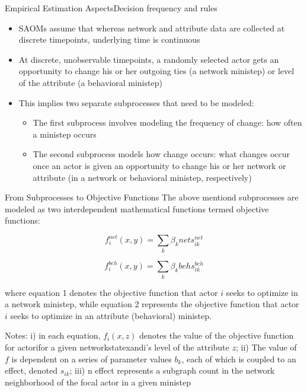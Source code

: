 \documentclass[notes, aspectratio=1610]{beamer}
\begin{document}
\begin{frame}{Empirical Estimation Aspects}{Decision frequency and rules}
	\begin{itemize}
		\item SAOMs assume that whereas network and attribute data 
		are collected at discrete timepoints, underlying time is 
		continuous
		\item At discrete, unobservable timepoints, a randomly 
		selected actor gets an opportunity to change his or her outgoing 
		ties (a network ministep) or level of the attribute (a 
		behavioral ministep)
		\item This implies two separate subprocesses that need to be 
		modeled:
		\begin{itemize}
			\item The first subprocess involves modeling the 
			frequency of change: how often a ministep occurs
			\item The second subprocess models how change occurs: 
			what changes occur once an actor is given an opportunity 
			to change his or her network or attribute (in a network 
			or behavioral ministep, respectively)
		\end{itemize}
	\end{itemize}
\end{frame}

\begin{frame}{From Subprocesses to Objective Functions}
	The above mentiond subprocesses are modeled as two interdependent 
	mathematical functions termed objective functions:
	
	
	\begin{equation}
		f_{i}^{net}(x, y) = \sum_{k}\beta_{k}{net}s_{ik}^{net}
	\end{equation}

	\begin{equation}
		f_{i}^{beh}(x, y) = \sum_{k}\beta_{k}{beh}s_{ik}^{beh}
	\end{equation}

	where equation 1 denotes the objective function that actor $i$ seeks 
	to optimize in a network ministep, while equation 2 represents the 
	objective function that actor $i$ seeks to optimize in an attribute 
	(behavioral) ministep.

	\small Notes: i) in each equation, $f_{i}(x,z)$ denotes the value of the objective 
	function for actorifor a given networkstatexandi's level of the 
	attribute $z$; ii) The value of $f$ is dependent on a series of parameter 
	values $b_{k}$, each of which is coupled to an effect, denoted $s_{ik}$; 
	iii) n effect represents a subgraph count in the network neighborhood of 
	the focal actor in a given ministep 
\end{frame}
\end{document}
